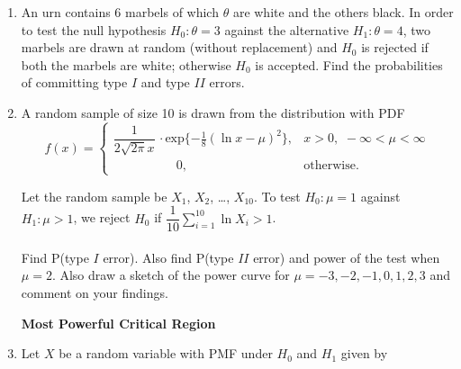 \documentclass[11pt, a4paper]{article}
\begin{document}
\begin{enumerate}
	\item An urn contains 6 marbels of which $\theta$ are white and the others black. In order to test the null hypothesis $H_0 : \theta = 3$ against the alternative $H_1 : \theta = 4$, two marbels are drawn at random (without replacement) and $H_0$ is rejected if both the marbels are white; otherwise $H_0$ is accepted. Find the probabilities of committing type $I$ and type $II$ errors.
	
	
	
	
	
\vspace{50pt}	
	
	
	
	\item A random sample of size 10 is drawn from the distribution with PDF
	\begin{equation*}
	 f(x) =
		\begin{cases}
		 \dfrac{1}{2\sqrt{2\pi}x} \, \cdot \text{exp}\{-\frac{1}{8}(\ln x - \mu )^2\}, & x > 0, \,\, -\infty < \mu < \infty  \\
		 \hspace{60pt} 0, & \text{otherwise}.
		\end{cases}
	\end{equation*}
	
	Let the random sample be $X_1$, $X_2$, \ldots, $X_{10}$. To test $H_0 : \mu = 1$ against $H_1 : \mu > 1$, we reject $H_0$ if $\dfrac{1}{10} \sum\limits_{i = 1}^{10} \ln X_i > 1$. \\ \\
	Find P(type $I$ error). Also find P(type $II$ error) and power of the test when $\mu = 2$. Also draw a sketch of the power curve for $\mu = -3, -2, -1, 0, 1, 2, 3$ and comment on your findings.
	
	
	
	
	




\newpage

\begin{center}

\textbf{\huge Most Powerful Critical Region}

\end{center}


\vspace{50pt}
	


	\item Let $X$ be a random variable with PMF under $H_0$ and $H_1$ given by
	

\end{enumerate}
\end{document}
